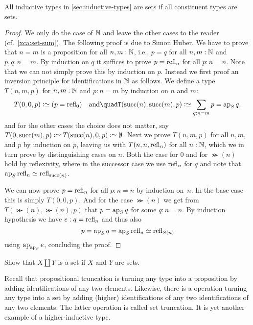 \begin{theorem}\label{thm:isset-inductive-types}
All inductive types in \cref{sec:inductive-types} are sets
if all constituent types are sets.
\end{theorem}

\begin{proof}
  We only do the case of $\mathbb{N}$ and leave the other cases to the reader
  (cf.\ \cref{xca:set-sum}). The following proof is due to Simon Huber.
  We have to prove that $n=m$ is a
  proposition for all $n,m:\mathbb{N}$, i.e., $p = q$ for all $n,m : \mathbb{N}$ and
  $p, q : n = m$.  By induction on $q$ it suffices to prove $p = \mathrm{refl}_{n}$ for all $p : n = n$.  Note that we can not simply prove this by
  induction on $p$.  Instead we first proof an inversion principle for
  identifications in $\mathbb{N}$ as follows.  We define a type $T(n,m,p)$
  for $n, m : \mathbb{N}$ and $p : n = m$ by induction on $n$ and $m$:
  \[
    T(0,0,p) \defeq (p = \refl{0})%
    \quad \text{and} \quad%
    T(\Succ(n), \Succ(m), p) \defeq \sum_{q : n = m} p = \ap S q,%
  \]
  and for the other cases the choice does not matter, say $T(0, \Succ(m),
  p) \defeq T(\Succ(n), 0 ,p) \defeq \emptytype$.  Next we prove $T(n,m,p)$
  for all $n,m$, and $p$ by induction on $p$, leaving us with
  $T(n,n,\mathrm{refl}_{n})$ for all $n : \mathbb{N}$, which we in turn prove by
  distinguishing cases on $n$.  Both the case for $0$ and for $\Succ(n)$
  hold by reflexivity, where in the successor case we use $\mathrm{refl}_{n}$
  for $q$ and note that $\ap S \refl{n} \jdeq \refl{\Succ(n)}$.

  We can now prove $p = \mathrm{refl}_{n}$ for all $p : n = n$ by induction
  on~$n$.  In the base case this is simply $T(0,0,p)$.  And for the
  case $\Succ(n)$ we get from $T(\Succ(n),\Succ(n),p)$ that $p = \ap{S} q$ for
  some $q : n = n$.  By induction hypothesis we have $e : q =
  \mathrm{refl}_{n}$ and thus also
  \[
    p = \ap{S} q = \ap{S} \refl{n} \jdeq \refl{S (n)}
  \]
  using $\ap{\ap{S}} e$, concluding the proof.
\end{proof}

\begin{xca}\label{xca:set-sum}
Show that $X\amalg Y$ is a set if $X$ and $Y$ are sets.
\end{xca}

Recall that propositional truncation is turning any type into
a proposition by adding identifications of any two elements.
Likewise, there is a operation turning any type into a set
by adding (higher) identifications of any two identifications
of any two elements. The latter operation is called set truncation.
It is yet another example of a higher-inductive type.

